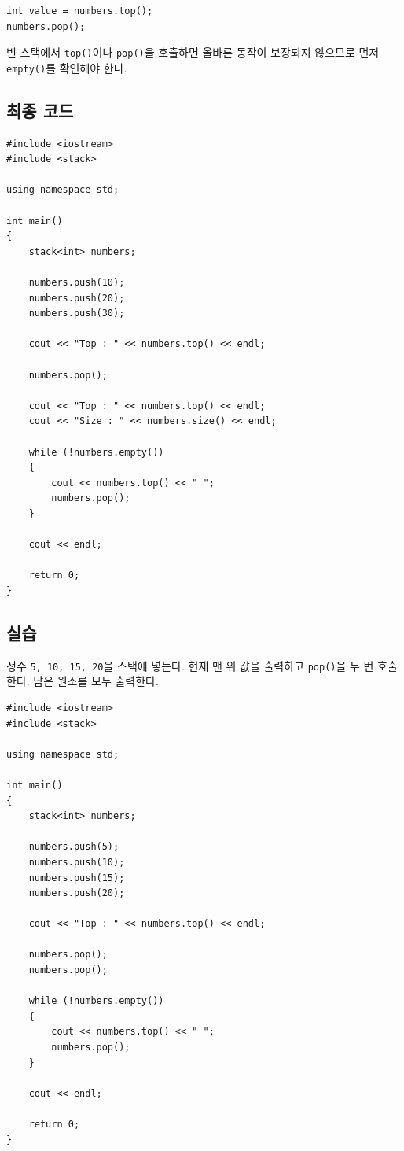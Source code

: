 \documentclass[11pt,a4paper]{article}
\begin{document}
\begin{lstlisting}
int value = numbers.top();
numbers.pop();
\end{lstlisting}

빈 스택에서 \texttt{top()}이나 \texttt{pop()}을 호출하면 올바른 동작이 보장되지 않으므로 먼저 \texttt{empty()}를 확인해야 한다.

\subsection{최종 코드}
\begin{lstlisting}
#include <iostream>
#include <stack>

using namespace std;

int main()
{
    stack<int> numbers;

    numbers.push(10);
    numbers.push(20);
    numbers.push(30);

    cout << "Top : " << numbers.top() << endl;

    numbers.pop();

    cout << "Top : " << numbers.top() << endl;
    cout << "Size : " << numbers.size() << endl;

    while (!numbers.empty())
    {
        cout << numbers.top() << " ";
        numbers.pop();
    }

    cout << endl;

    return 0;
}
\end{lstlisting}

\subsection{실습}
\begin{practicebox}
정수 \texttt{5, 10, 15, 20}을 스택에 넣는다. 현재 맨 위 값을 출력하고 \texttt{pop()}을 두 번 호출한다. 남은 원소를 모두 출력한다.
\end{practicebox}

\begin{lstlisting}
#include <iostream>
#include <stack>

using namespace std;

int main()
{
    stack<int> numbers;

    numbers.push(5);
    numbers.push(10);
    numbers.push(15);
    numbers.push(20);

    cout << "Top : " << numbers.top() << endl;

    numbers.pop();
    numbers.pop();

    while (!numbers.empty())
    {
        cout << numbers.top() << " ";
        numbers.pop();
    }

    cout << endl;

    return 0;
}
\end{lstlisting}
\end{document}
